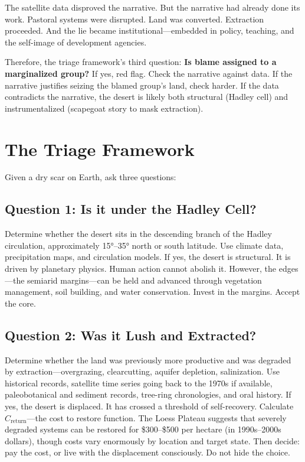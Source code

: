 \documentclass[12pt,a4paper]{article}
\begin{document}
The satellite data disproved the narrative. But the narrative had already done its work. Pastoral systems were disrupted. Land was converted. Extraction proceeded. And the lie became institutional—embedded in policy, teaching, and the self-image of development agencies.

Therefore, the triage framework's third question: \textbf{Is blame assigned to a marginalized group?} If yes, red flag. Check the narrative against data. If the narrative justifies seizing the blamed group's land, check harder. If the data contradicts the narrative, the desert is likely both structural (Hadley cell) and instrumentalized (scapegoat story to mask extraction).

\section{The Triage Framework}

Given a dry scar on Earth, ask three questions:

\subsection{Question 1: Is it under the Hadley Cell?}

Determine whether the desert sits in the descending branch of the Hadley circulation, approximately 15°–35° north or south latitude. Use climate data, precipitation maps, and circulation models. If yes, the desert is structural. It is driven by planetary physics. Human action cannot abolish it. However, the edges—the semiarid margins—can be held and advanced through vegetation management, soil building, and water conservation. Invest in the margins. Accept the core.

\subsection{Question 2: Was it Lush and Extracted?}

Determine whether the land was previously more productive and was degraded by extraction—overgrazing, clearcutting, aquifer depletion, salinization. Use historical records, satellite time series going back to the 1970s if available, paleobotanical and sediment records, tree-ring chronologies, and oral history. If yes, the desert is displaced. It has crossed a threshold of self-recovery. Calculate $C_{\text{return}}$—the cost to restore function. The Loess Plateau suggests that severely degraded systems can be restored for \$300–\$500 per hectare (in 1990s–2000s dollars), though costs vary enormously by location and target state. Then decide: pay the cost, or live with the displacement consciously. Do not hide the choice.
\end{document}
